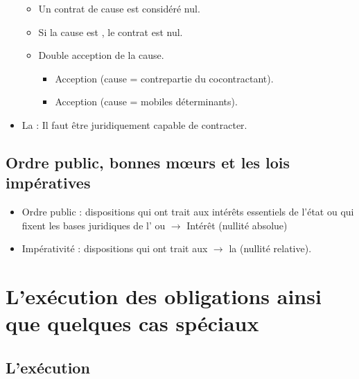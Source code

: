 \begin{itemize}
	\begin{itemize}
		\item Un contrat  de cause est considéré nul.
		\item Si la cause est , le contrat est nul.
		\item Double acception de la cause.
		\begin{itemize}
			\item Acception  (cause = contrepartie du cocontractant).
			\item Acception  (cause = mobiles déterminants).
		\end{itemize}
	\end{itemize}
	\item La  : Il faut être juridiquement capable de contracter.
\end{itemize}

\subsection{Ordre public, bonnes mœurs et les lois impératives}

\begin{itemize}
	\item Ordre public : dispositions qui ont trait aux intérêts essentiels de l'état ou qui fixent les bases juridiques de l' ou  $\rightarrow$ Intérêt  (nullité absolue)
	\item Impérativité : dispositions qui ont trait aux  $\rightarrow$ la  (nullité relative).
\end{itemize}

\section{L'exécution des obligations ainsi que quelques cas spéciaux}

\subsection{L'exécution}

